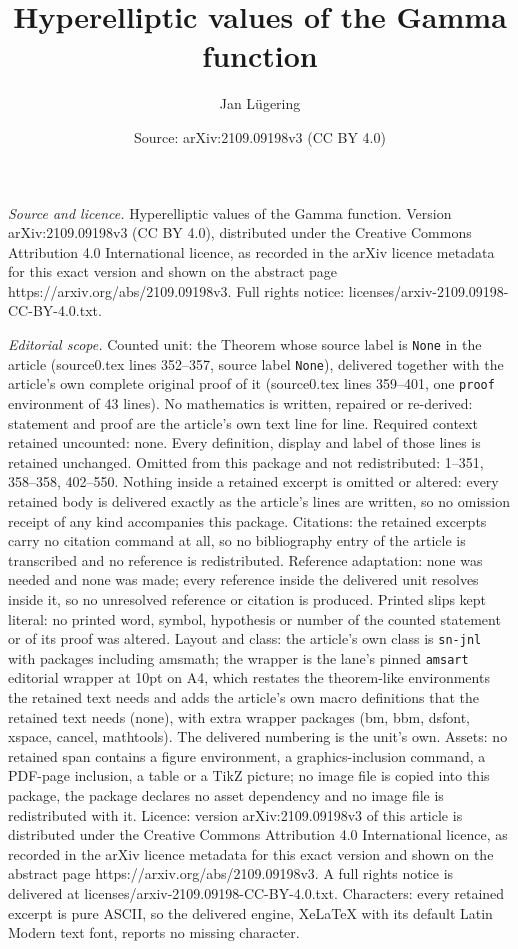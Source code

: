 \documentclass[10pt,a4paper]{amsart}
\title[Hyperelliptic values of the Gamma function]{Hyperelliptic values of the Gamma function}
\author{Jan L\"ugering}
\date{Source: arXiv:2109.09198v3 (CC BY 4.0)}
\begin{document}
\maketitle

\noindent\emph{Source and licence.} Hyperelliptic values of the Gamma function. Version arXiv:2109.09198v3 (CC BY 4.0), distributed under the Creative Commons Attribution 4.0 International licence, as recorded in the arXiv licence metadata for this exact version and shown on the abstract page https://arxiv.org/abs/2109.09198v3. Full rights notice: licenses/arxiv-2109.09198-CC-BY-4.0.txt.\par\smallskip

\noindent\textit{Editorial scope.} Counted unit: the Theorem whose source label is \texttt{None} in the article (source0.tex lines 352--357, source label \texttt{None}), delivered together with the article's own complete original proof of it (source0.tex lines 359--401, one \texttt{proof} environment of 43 lines). No mathematics is written, repaired or re-derived: statement and proof are the article's own text line for line. Required context retained uncounted: none. Every definition, display and label of those lines is retained unchanged. Omitted from this package and not redistributed: 1--351, 358--358, 402--550. Nothing inside a retained excerpt is omitted or altered: every retained body is delivered exactly as the article's lines are written, so no omission receipt of any kind accompanies this package. Citations: the retained excerpts carry no citation command at all, so no bibliography entry of the article is transcribed and no reference is redistributed. Reference adaptation: none was needed and none was made; every reference inside the delivered unit resolves inside it, so no unresolved reference or citation is produced. Printed slips kept literal: no printed word, symbol, hypothesis or number of the counted statement or of its proof was altered. Layout and class: the article's own class is \texttt{sn-jnl} with packages including amsmath; the wrapper is the lane's pinned \texttt{amsart} editorial wrapper at 10pt on A4, which restates the theorem-like environments the retained text needs and adds the article's own macro definitions that the retained text needs (none), with extra wrapper packages (bm, bbm, dsfont, xspace, cancel, mathtools). The delivered numbering is the unit's own. Assets: no retained span contains a figure environment, a graphics-inclusion command, a PDF-page inclusion, a table or a TikZ picture; no image file is copied into this package, the package declares no asset dependency and no image file is redistributed with it. Licence: version arXiv:2109.09198v3 of this article is distributed under the Creative Commons Attribution 4.0 International licence, as recorded in the arXiv licence metadata for this exact version and shown on the abstract page https://arxiv.org/abs/2109.09198v3. A full rights notice is delivered at licenses/arxiv-2109.09198-CC-BY-4.0.txt. Characters: every retained excerpt is pure ASCII, so the delivered engine, XeLaTeX with its default Latin Modern text font, reports no missing character.
\end{document}
